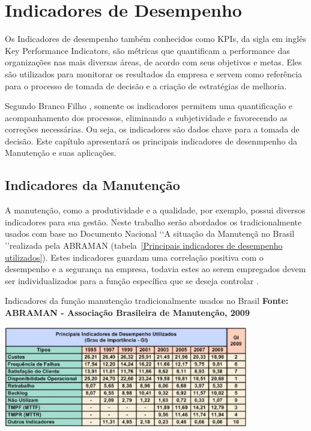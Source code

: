 \chapter{Indicadores de Desempenho}
\label{indicadores}

Os Indicadores de desempenho também conhecidos como KPIs, da sigla em inglês Key Performance Indicators, são métricas que quantificam a performance das organizações nas mais diversas áreas, de acordo com seus objetivos e metas. Eles são utilizados para monitorar os resultados da empresa e servem como referência para o processo de tomada de decisão e a criação de estratégias de melhoria. 

Segundo Branco Filho \cite{branco2006indicadores}, somente os indicadores permitem uma quantificação e acompanhamento dos processos, eliminando a subjetividade e favorecendo as correções necessárias. Ou seja, os indicadores são dados chave para a tomada de decisão. Este capítulo apresentará os principais indicadores de desenmpenho da Manutenção e suas aplicações.

\section{Indicadores da Manutenção}
\label{SIM}

A manutenção, como a produtividade e a qualidade, por exemplo, possui diversos indicadores para sua gestão. Neste trabalho serão abordados os tradicionalmente usados com base no Documento Nacional \lq\lq A situação da Manutençã no Brasil \rq\rq realizada pela ABRAMAN (tabela~\ref{Principais indicadores de desempenho utilizados}). Estes indicadores guardam uma correlação positiva com o desempenho e a segurança na empresa, todavia estes ao serem empregados devem ser individualizados para a função específica que se deseja controlar \cite{martorell1999}.

\graphicspath{{figuras/}}	
\begin{table}[H]
\centering
\caption{Indicadores da função manutenção tradicionalmente usados no Brasil \textbf{Fonte: ABRAMAN - Associação Brasileira de Manutenção, 2009}}
\includegraphics[width=0.8\textwidth]{PrincipaisIndicadores.eps}
\label{Principais indicadores de desempenho utilizados}
\end{table}

